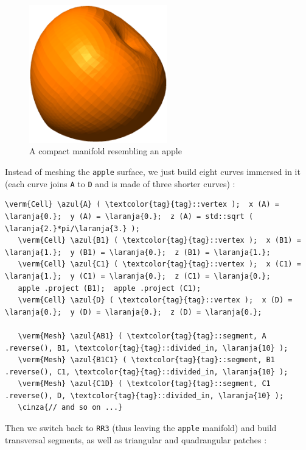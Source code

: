\begin{figure}[ht] \centering
  \includegraphics[width=60mm]{fisalis-manif}
  \caption{A compact manifold resembling an apple}
  \label{\numb section 2.\numb fig 15}
\end{figure}

Instead of meshing the {\small\tt apple} surface, we just build eight curves immersed in it
(each curve joins {\small\tt A} to {\small\tt D} and is made of three shorter curves) :

\begin{Verbatim}[commandchars=\\\{\},formatcom=\small\tt,frame=single,
   label=parag-\ref{\numb section 2.\numb parag 14}.cpp,rulecolor=\color{moldura},
   baselinestretch=0.94,framesep=2mm]
   \verm{Cell} \azul{A} ( \textcolor{tag}{tag}::vertex );  x (A) = \laranja{0.};  y (A) = \laranja{0.};  z (A) = std::sqrt ( \laranja{2.}*pi/\laranja{3.} );
   \verm{Cell} \azul{B1} ( \textcolor{tag}{tag}::vertex );  x (B1) = \laranja{1.};  y (B1) = \laranja{0.};  z (B1) = \laranja{1.};
   \verm{Cell} \azul{C1} ( \textcolor{tag}{tag}::vertex );  x (C1) = \laranja{1.};  y (C1) = \laranja{0.};  z (C1) = \laranja{0.};
   apple .project (B1);  apple .project (C1);
   \verm{Cell} \azul{D} ( \textcolor{tag}{tag}::vertex );  x (D) = \laranja{0.};  y (D) = \laranja{0.};  z (D) = \laranja{0.};

   \verm{Mesh} \azul{AB1} ( \textcolor{tag}{tag}::segment, A .reverse(), B1, \textcolor{tag}{tag}::divided_in, \laranja{10} );
   \verm{Mesh} \azul{B1C1} ( \textcolor{tag}{tag}::segment, B1 .reverse(), C1, \textcolor{tag}{tag}::divided_in, \laranja{10} );
   \verm{Mesh} \azul{C1D} ( \textcolor{tag}{tag}::segment, C1 .reverse(), D, \textcolor{tag}{tag}::divided_in, \laranja{10} );
   \cinza{// and so on ...}
\end{Verbatim}

Then we switch back to {\small\tt RR3} (thus leaving the {\small\tt apple} manifold) and build
transversal segments, as well as triangular and quadrangular patches :

